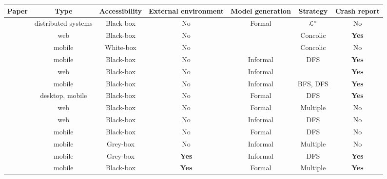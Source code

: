 \begin{table}
    \begin{center}
	\begin{tabular}{| c | c | c | c | c | c | c |}

		\hline

        Paper & Type & Accessibility & External environment & Model
        generation & Strategy & Crash report \\
		\hline


        \cite{hungar2002} & distributed systems & Black-box & No &
        Formal & $\EuScript{L}^*$ & No
        \\
        \cite{5416728} &web & Black-box  & No  &  & Concolic & \textbf{Yes}
        \\
        \cite{concolicandroid12} & mobile & White-box  & No &  &
        Concolic & No
        \\
        \cite{Joorabchi:2012:REI:2420240.2420457} & mobile &
        Black-box & No & Informal & DFS & \textbf{Yes}
        \\
		\cite{webmate12} & web & Black-box & No & Informal & & \textbf{Yes}
        \\
        \cite{5954416,Amalfitano:2012:UGR:2351676.2351717} &
        mobile & Black-box  & No & Informal  & BFS, DFS & \textbf{Yes}
        \\
		\cite{guitar,MobiGUITARIEEESoftware2014} & desktop,
		mobile & Black-box & No & Formal & DFS & \textbf{Yes}
        \\
        \cite{crawljax:tweb12} & web & Black-box & No & Formal &
        Multiple & No
        \\
        \cite{4656395} & web & Black-box & No & Informal & DFS & No
        \\
        \cite{Choi2013} & mobile & Black-box & No & Formal & DFS &
        No
        \\
		\cite{WPX13} & mobile & Grey-box & No & Informal & Multiple
		& No
        \\
        \cite{Azim13} & mobile & Grey-box & \textbf{Yes} & Informal & DFS
        & \textbf{Yes}
        \\
        \cite{SP15} & mobile & Black-box & \textbf{Yes} & Formal &
        Multiple & \textbf{Yes}
        \\
		\hline
	\end{tabular}
\end{center}


\end{table}
